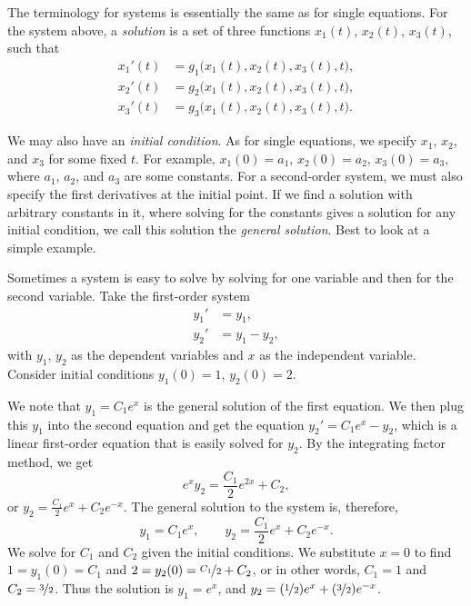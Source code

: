 The terminology for systems is essentially the same as for
single equations.
For the system above, a
\emph{solution}
is a set of three functions $x_1(t)$, $x_2(t)$, $x_3(t)$, such that
\begin{equation*}
\begin{aligned}
x_1'(t) &= g_1\bigl(x_1(t),x_2(t),x_3(t),t\bigr) , \\
x_2'(t) &= g_2\bigl(x_1(t),x_2(t),x_3(t),t\bigr) , \\
x_3'(t) &= g_3\bigl(x_1(t),x_2(t),x_3(t),t\bigr) .
\end{aligned}
\end{equation*}

We may also have an
\emph{initial condition}.
As for single equations, we specify $x_1$, $x_2$, and $x_3$ for some fixed $t$.
For example, $x_1(0) = a_1$, $x_2(0) = a_2$, $x_3(0) = a_3$,
where $a_1$, $a_2$, and $a_3$ are some constants.
For a second-order system,
we must also specify the first derivatives at the initial point.
If we find a solution with arbitrary constants in it,
where solving for the constants gives a solution for
any initial condition, we call this solution the
\emph{general solution}.
Best to look at a simple example.

\begin{example} \label{example:simplesystem}
Sometimes a system is easy to solve
by solving for one variable and then for the second variable.
Take 
the first-order system
\begin{equation*}
\begin{aligned}
y_1' & = y_1 , \\
y_2' & = y_1 - y_2 ,
\end{aligned}
\end{equation*}
with $y_1$, $y_2$ as the dependent variables and $x$ as the independent
variable.  Consider initial conditions
$y_1(0) = 1$, $y_2(0) = 2$.

We note that $y_1 = C_1 e^x$ is the general solution of the first equation.
We then plug this $y_1$ into the second equation
and get the equation $y_2' = C_1e^x - y_2$, which is a linear
first-order
equation that is easily solved for $y_2$.
By the integrating factor method, we get
\begin{equation*}
e^x y_2 = \frac{C_1}{2}e^{2x} + C_2 ,
\end{equation*}
or $y_2 = \frac{C_1}{2}e^{x} + C_2e^{-x}$.  The general solution to the system
is, therefore,
\begin{equation*}
y_1 = C_1 e^x , \qquad
y_2 = \frac{C_1}{2}e^{x} + C_2e^{-x} .
\end{equation*}
We solve for $C_1$ and $C_2$ given the initial conditions.
We substitute $x=0$ to find
$1 = y_1(0) = C_1$ and
$2 = y_2(0) = \nicefrac{C_1}{2} + C_2$,
or in other words,
$C_1=1$ and $C_2=\nicefrac{3}{2}$.  Thus the solution is
$y_1 = e^x$, and
$y_2 = (\nicefrac{1}{2}) e^x + (\nicefrac{3}{2}) e^{-x}$.
\end{example}

